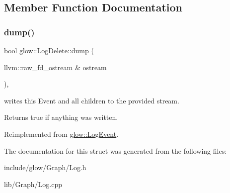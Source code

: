 \subsection{Member Function Documentation}
\mbox{\label{structglow_1_1_log_delete_a8d29cdcc6351be77ac45d28fef52a3f9}} 
\subsubsection{\texorpdfstring{dump()}{dump()}}
{\footnotesize\ttfamily bool glow\+::\+Log\+Delete\+::dump (\begin{DoxyParamCaption}\item[{llvm\+::raw\+\_\+fd\+\_\+ostream \&}]{ostream }\end{DoxyParamCaption})\hspace{0.3cm}{\ttfamily [override]}, {\ttfamily [virtual]}}

writes this Event and all children to the provided stream. \begin{DoxyReturn}{Returns}
true if anything was written. 
\end{DoxyReturn}


Reimplemented from \hyperlink{structglow_1_1_log_event_a1c25aa690ea65f6b184ba3133fd6c564}{glow\+::\+Log\+Event}.



The documentation for this struct was generated from the following files\+:\begin{DoxyCompactItemize}
\item 
include/glow/\+Graph/Log.\+h\item 
lib/\+Graph/Log.\+cpp\end{DoxyCompactItemize}
